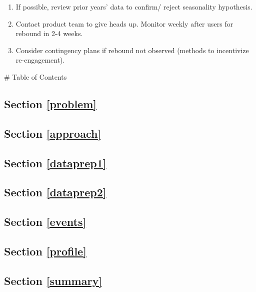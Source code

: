 \documentclass{report}
\providecommand{\tightlist}{%
      \setlength{\itemsep}{0pt}\setlength{\parskip}{0pt}}
\begin{document}
\begin{enumerate}
\def\labelenumi{\arabic{enumi})}
\tightlist
\item
  If possible, review prior years' data to confirm/ reject seasonality
  hypothesis.
\item
  Contact product team to give heads up. Monitor weekly after users for
  rebound in 2-4 weeks.
\item
  Consider contingency plans if rebound not observed (methods to
  incentivize re-engagement).
\end{enumerate}

 \# Table of Contents

\subsection{\texorpdfstring{Section \ref{problem}}{}}\label{initial-observation-and-issue-to-address}

\subsection{\texorpdfstring{Section \ref{approach}}{}}\label{hypotheses-and-approach}

\subsection{\texorpdfstring{Section \ref{dataprep1}}{}}\label{data-preparation---clean-and-load-data}

\subsection{\texorpdfstring{Section \ref{dataprep2}}{}}\label{data-preparation---assign-labels}

\subsection{\texorpdfstring{Section \ref{events}}{}}\label{user-events---interactions-with-weekly-email-digest}

\subsection{\texorpdfstring{Section \ref{profile}}{}}\label{user-profile---engagement-comparison-by-location-device-and-company}

\subsection{\texorpdfstring{Section \ref{summary}}{}}\label{summary-and-recommendations}
\end{document}
